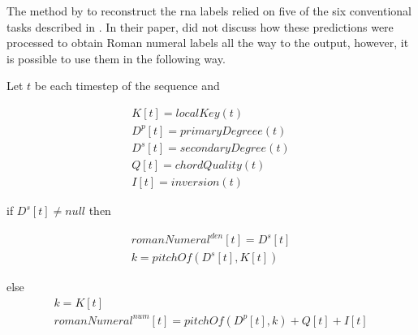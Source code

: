 
The method by \textcite{chen2018functional} to reconstruct
the \gls{rna} labels relied on five of the six conventional
tasks described in . In their
paper, \textcite{chen2018functional} did not discuss how
these predictions were processed to obtain Roman numeral
labels all the way to the output, however, it is possible to
use them in the following way.

Let $t$ be each timestep of the sequence and

\begin{equation}
\begin{split}
K[t] = localKey(t) \\
D^p[t] = primaryDegree e(t) \\
D^s[t] = secondaryDegree(t)  \\
Q[t] = chordQuality(t) \\
I[t] = inversion(t)
\end{split}
\end{equation}

if $D^s[t] \neq null$ then

\begin{equation}
\begin{split}
romanNumeral^{den}[t] = D^s[t] \\
k = pitchOf(D^s[t], K[t])
\end{split}
\end{equation}

else
\begin{equation}
\begin{split}
k = K[t] \\
romanNumeral^{num}[t] = pitchOf(D^p[t], k) + Q[t] + I[t] 
\end{split}
\end{equation}
